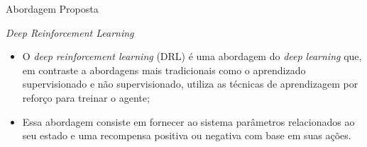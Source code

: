 \documentclass[aspectratio=169]{beamer}
\begin{document}

\begin{frame}{Abordagem Proposta}
	\begin{block}{\textit{Deep Reinforcement Learning}}
		\begin{itemize}
			\item 
			O \textit{deep reinforcement learning} (DRL) é uma abordagem do \textit{deep learning} que, em contraste a abordagens mais tradicionais como o aprendizado supervisionado e não supervisionado, utiliza as técnicas de aprendizagem por reforço para treinar o agente;

			\item Essa abordagem consiste em fornecer ao sistema parâmetros relacionados ao seu estado e uma recompensa positiva ou negativa com base em suas ações.
		\end{itemize}
	\end{block}
\end{frame}
\end{document}
